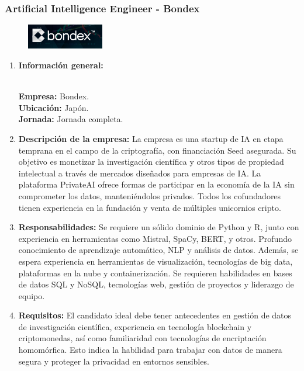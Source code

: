 \documentclass[12pt]{article}
\begin{document}
            \subsubsection{Artificial Intelligence Engineer - Bondex}

                \begin{figure}[!h]
                    \centering
                    \includegraphics[width=0.3\textwidth]{Recursos/Img/BondexLogo.png}
                \end{figure}

                \begin{enumerate}
                    \item \textbf{Información general:}
                    
                        \textbf{\\Empresa:} Bondex.
                        \textbf{\\Ubicación:} Japón.
                        \textbf{\\Jornada:} Jornada completa.

                    \item \textbf{Descripción de la empresa:}
                        La empresa es una startup de IA en etapa temprana en el campo de la criptografía, con financiación Seed asegurada. Su objetivo es monetizar la investigación científica y otros tipos de propiedad intelectual a través de mercados diseñados para empresas de IA. La plataforma PrivateAI ofrece formas de participar en la economía de la IA sin comprometer los datos, manteniéndolos privados. Todos los cofundadores tienen experiencia en la fundación y venta de múltiples unicornios cripto.

                    \item \textbf{Responsabilidades:}
                        Se requiere un sólido dominio de Python y R, junto con experiencia en herramientas como Mistral, SpaCy, BERT, y otros. Profundo conocimiento de aprendizaje automático, NLP y análisis de datos. Además, se espera experiencia en herramientas de visualización, tecnologías de big data, plataformas en la nube y containerización. Se requieren habilidades en bases de datos SQL y NoSQL, tecnologías web, gestión de proyectos y liderazgo de equipo.

                    \item \textbf{Requisitos:}
                        El candidato ideal debe tener antecedentes en gestión de datos de investigación científica, experiencia en tecnología blockchain y criptomonedas, así como familiaridad con tecnologías de encriptación homomórfica. Esto indica la habilidad para trabajar con datos de manera segura y proteger la privacidad en entornos sensibles.

                \end{enumerate}
\end{document}
